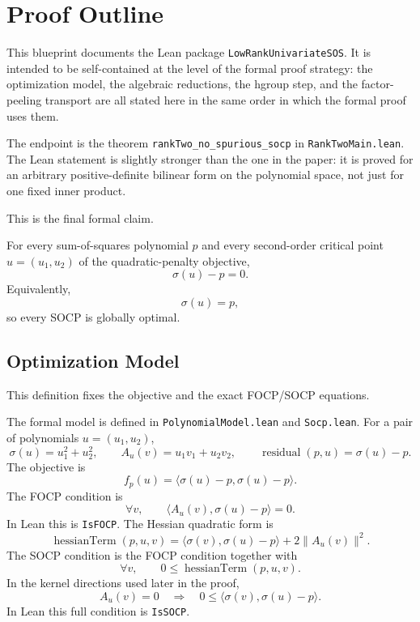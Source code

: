 \chapter{Proof Outline}

This blueprint documents the Lean package \texttt{LowRankUnivariateSOS}. It is
intended to be self-contained at the level of the formal proof strategy: the
optimization model, the algebraic reductions, the hgroup step, and the
factor-peeling transport are all stated here in the same order in which the
formal proof uses them.

The endpoint is the theorem \texttt{rankTwo\_no\_spurious\_socp} in
\texttt{RankTwoMain.lean}. The Lean statement is slightly stronger than the one
in the paper: it is proved for an arbitrary positive-definite bilinear form on
the polynomial space, not just for one fixed inner product.

This is the final formal claim.
\begin{theorem}\label{thm:main}
\leanok
For every sum-of-squares polynomial $p$ and every second-order critical point
$u=(u_1,u_2)$ of the quadratic-penalty objective,
\[
\sigma(u)-p = 0.
\]
Equivalently,
\[
\sigma(u)=p,
\]
so every SOCP is globally optimal.
\end{theorem}

\section{Optimization Model}

This definition fixes the objective and the exact FOCP/SOCP equations.
\begin{definition}\label{def:model}
\leanok
The formal model is defined in \texttt{PolynomialModel.lean} and
\texttt{Socp.lean}. For a pair of polynomials $u=(u_1,u_2)$,
\[
\sigma(u)=u_1^2+u_2^2,\qquad
A_u(v)=u_1v_1+u_2v_2,\qquad
\operatorname{residual}(p,u)=\sigma(u)-p.
\]
The objective is
\[
f_p(u)=\langle \sigma(u)-p,\sigma(u)-p\rangle.
\]
The FOCP condition is
\[
\forall v,\qquad \langle A_u(v),\sigma(u)-p\rangle = 0.
\]
In Lean this is \texttt{IsFOCP}. The Hessian quadratic form is
\[
\operatorname{hessianTerm}(p,u,v)=
\langle \sigma(v),\sigma(u)-p\rangle + 2\|A_u(v)\|^2.
\]
The SOCP condition is the FOCP condition together with
\[
\forall v,\qquad 0 \le \operatorname{hessianTerm}(p,u,v).
\]
In the kernel directions used later in the proof,
\[
A_u(v)=0
\quad\Longrightarrow\quad
0 \le \langle \sigma(v),\sigma(u)-p\rangle.
\]
In Lean this full condition is \texttt{IsSOCP}.
\end{definition}

